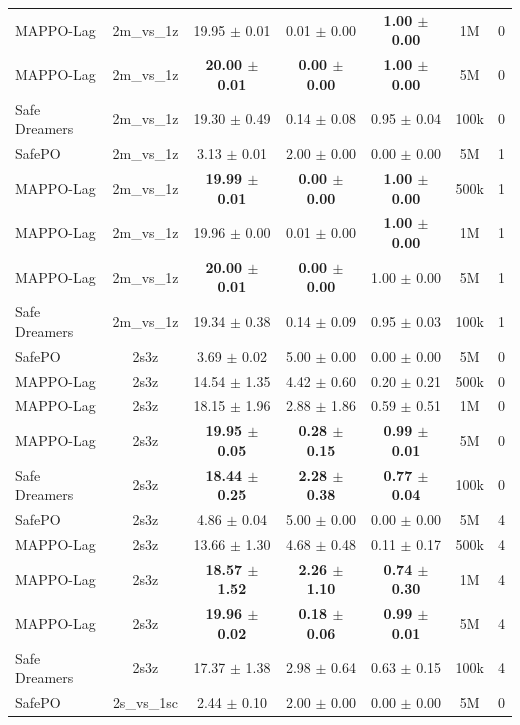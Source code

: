 \begin{longtable}{lcccccc}
MAPPO-Lag & 2m\_vs\_1z & 19.95 $\pm$ 0.01 & 0.01 $\pm$ 0.00 & \textbf{1.00 $\pm$ 0.00} & 1M & 0 \\
MAPPO-Lag & 2m\_vs\_1z & \textbf{20.00 $\pm$ 0.01} & \textbf{0.00 $\pm$ 0.00} & \textbf{1.00 $\pm$ 0.00} & 5M & 0 \\
Safe Dreamers & 2m\_vs\_1z & 19.30 $\pm$ 0.49 & 0.14 $\pm$ 0.08 & 0.95 $\pm$ 0.04 & 100k & 0 \\
\midrule
SafePO & 2m\_vs\_1z & 3.13 $\pm$ 0.01 & 2.00 $\pm$ 0.00 & 0.00 $\pm$ 0.00 & 5M & 1 \\
MAPPO-Lag & 2m\_vs\_1z & \textbf{19.99 $\pm$ 0.01} & \textbf{0.00 $\pm$ 0.00} & \textbf{1.00 $\pm$ 0.00} & 500k & 1 \\
MAPPO-Lag & 2m\_vs\_1z & 19.96 $\pm$ 0.00 & 0.01 $\pm$ 0.00 & \textbf{1.00 $\pm$ 0.00} & 1M & 1 \\
MAPPO-Lag & 2m\_vs\_1z & \textbf{20.00 $\pm$ 0.01} & \textbf{0.00 $\pm$ 0.00} & 1.00 $\pm$ 0.00 & 5M & 1 \\
Safe Dreamers & 2m\_vs\_1z & 19.34 $\pm$ 0.38 & 0.14 $\pm$ 0.09 & 0.95 $\pm$ 0.03 & 100k & 1 \\
\midrule
SafePO & 2s3z & 3.69 $\pm$ 0.02 & 5.00 $\pm$ 0.00 & 0.00 $\pm$ 0.00 & 5M & 0 \\
MAPPO-Lag & 2s3z & 14.54 $\pm$ 1.35 & 4.42 $\pm$ 0.60 & 0.20 $\pm$ 0.21 & 500k & 0 \\
MAPPO-Lag & 2s3z & 18.15 $\pm$ 1.96 & 2.88 $\pm$ 1.86 & 0.59 $\pm$ 0.51 & 1M & 0 \\
MAPPO-Lag & 2s3z & \textbf{19.95 $\pm$ 0.05} & \textbf{0.28 $\pm$ 0.15} & \textbf{0.99 $\pm$ 0.01} & 5M & 0 \\
Safe Dreamers & 2s3z & \textbf{18.44 $\pm$ 0.25} & \textbf{2.28 $\pm$ 0.38} & \textbf{0.77 $\pm$ 0.04} & 100k & 0 \\
\midrule
SafePO & 2s3z & 4.86 $\pm$ 0.04 & 5.00 $\pm$ 0.00 & 0.00 $\pm$ 0.00 & 5M & 4 \\
MAPPO-Lag & 2s3z & 13.66 $\pm$ 1.30 & 4.68 $\pm$ 0.48 & 0.11 $\pm$ 0.17 & 500k & 4 \\
MAPPO-Lag & 2s3z & \textbf{18.57 $\pm$ 1.52} & \textbf{2.26 $\pm$ 1.10} & \textbf{0.74 $\pm$ 0.30} & 1M & 4 \\
MAPPO-Lag & 2s3z & \textbf{19.96 $\pm$ 0.02} & \textbf{0.18 $\pm$ 0.06} & \textbf{0.99 $\pm$ 0.01} & 5M & 4 \\
Safe Dreamers & 2s3z & 17.37 $\pm$ 1.38 & 2.98 $\pm$ 0.64 & 0.63 $\pm$ 0.15 & 100k & 4 \\
\midrule
SafePO & 2s\_vs\_1sc & 2.44 $\pm$ 0.10 & 2.00 $\pm$ 0.00 & 0.00 $\pm$ 0.00 & 5M & 0 \\

\end{longtable}
